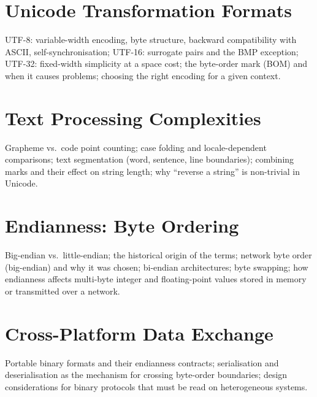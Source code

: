\chapter{Unicode Transformation Formats}
\label{ch:utf}

UTF-8: variable-width encoding, byte structure, backward compatibility with
ASCII, self-synchronisation; UTF-16: surrogate pairs and the BMP exception;
UTF-32: fixed-width simplicity at a space cost; the byte-order mark (BOM)
and when it causes problems; choosing the right encoding for a given context.

\chapter{Text Processing Complexities}
\label{ch:text-processing}

Grapheme vs.\ code point counting; case folding and locale-dependent
comparisons; text segmentation (word, sentence, line boundaries); combining
marks and their effect on string length; why ``reverse a string'' is
non-trivial in Unicode.



\chapter{Endianness: Byte Ordering}
\label{ch:endianness}

Big-endian vs.\ little-endian; the historical origin of the terms; network
byte order (big-endian) and why it was chosen; bi-endian architectures;
byte swapping; how endianness affects multi-byte integer and floating-point
values stored in memory or transmitted over a network.

\chapter{Cross-Platform Data Exchange}
\label{ch:cross-platform}

Portable binary formats and their endianness contracts; serialisation and
deserialisation as the mechanism for crossing byte-order boundaries; design
considerations for binary protocols that must be read on heterogeneous
systems.




